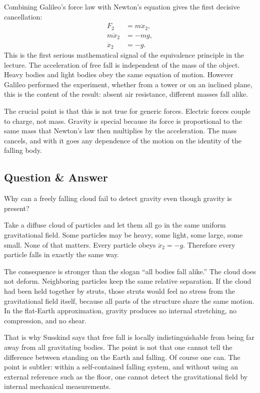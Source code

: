 Combining Galileo's force law with Newton's equation gives the first decisive cancellation:
\begin{align}
F_2 &= m\ddot x_2, \\
m\ddot x_2 &= -mg, \\
\ddot x_2 &= -g.
\end{align}
This is the first serious mathematical signal of the equivalence principle in the lecture. The acceleration of free fall is independent of the mass of the object. Heavy bodies and light bodies obey the same equation of motion. However Galileo performed the experiment, whether from a tower or on an inclined plane, this is the content of the result: absent air resistance, different masses fall alike.

The crucial point is that this is not true for generic forces. Electric forces couple to charge, not mass. Gravity is special because its force is proportional to the same mass that Newton's law then multiplies by the acceleration. The mass cancels, and with it goes any dependence of the motion on the identity of the falling body.

\subsection{Question \& Answer}

Why can a freely falling cloud fail to detect gravity even though gravity is present?

Take a diffuse cloud of particles and let them all go in the same uniform gravitational field. Some particles may be heavy, some light, some large, some small. None of that matters. Every particle obeys \(\ddot x_2=-g\). Therefore every particle falls in exactly the same way.

The consequence is stronger than the slogan ``all bodies fall alike.'' The cloud does not deform. Neighboring particles keep the same relative separation. If the cloud had been held together by struts, those struts would feel no stress from the gravitational field itself, because all parts of the structure share the same motion. In the flat-Earth approximation, gravity produces no internal stretching, no compression, and no shear.

That is why Susskind says that free fall is locally indistinguishable from being far away from all gravitating bodies. The point is not that one cannot tell the difference between standing on the Earth and falling. Of course one can. The point is subtler: within a self-contained falling system, and without using an external reference such as the floor, one cannot detect the gravitational field by internal mechanical measurements.

